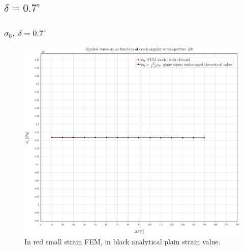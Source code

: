 \documentclass[first,firstsupp,lastsupp,handout,last,hyperref,table]{ETHclass}
\begin{document}

\subsection{$\delta=0.7^{\circ}$}

\begin{frame}
\frametitle{\small $\sigma_{0}$, $\delta=0.7^{\circ}$}
\vspace{-0.5cm}
\centering
\captionsetup[figure]{font=scriptsize,labelfont=scriptsize}
\begin{figure}[!h]
\centering
\includegraphics[height=0.7\textheight]{2017-07-10_AbqRunSummary_SmallStrainD07_sigma-inf_Summary.pdf}
  \caption{\scriptsize In red small strain FEM, in black analytical plain strain value.}
  \label{fig:res1}
\end{figure}
\end{frame}
\end{document}
